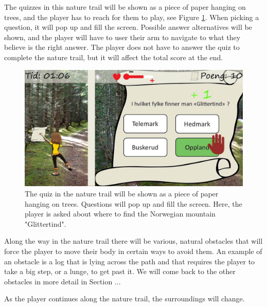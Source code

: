 The quizzes  in this nature trail will be shown as a piece of paper hanging on trees, and the player has to reach for them to play, see Figure \ref{fig:quiz}. When picking a question, it will pop up and fill the screen. Possible answer alternatives will be shown, and the player will have to user their arm to navigate to what they believe is the right answer. The player does not have to answer the quiz to complete the nature trail, but it will affect the total score at the end. 

\begin{figure} [H]
\centering
\includegraphics[scale=0.5]{quiz.jpg}
\caption[Nature trail - quiz]{The quiz in the nature trail will be shown as a piece of paper hanging on trees. Questions will pop up and fill the screen. Here, the player is asked about where to find the Norwegian mountain "Glittertind".}
\label{fig:quiz}
\end{figure} 

Along the way in the nature trail there will be various, natural obstacles that will force the player to move their body in certain ways to avoid them. An example of an obstacle is a log that is lying across the path and that requires the player to take a big step, or a lunge, to get past it. We will come back to the other obstacles in more detail in Section ... 

As the player continues along the nature trail, the surroundings will change.

